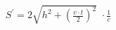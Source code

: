 \documentclass[preview]{standalone}
\begin{document}
\begin{align*}
S^{'}=2 \sqrt{h^2+( \frac{v \cdot t}{2})^2}\,\,\cdot {\frac{1}{c}}
\end{align*}
\end{document}
